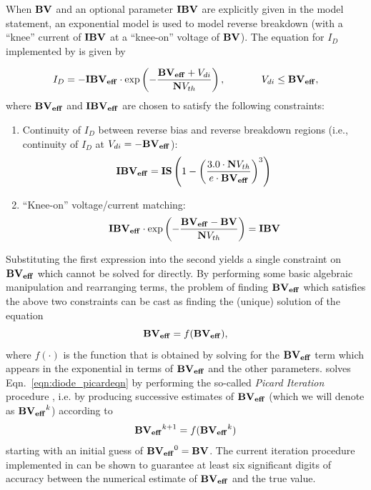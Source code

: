 When $\mathbf{BV}$ and an optional parameter $\mathbf{IBV}$ are explicitly given in the model
statement, an exponential model is used to model reverse breakdown (with a
``knee'' current of $\mathbf{IBV}$ at a ``knee-on'' voltage of $\mathbf{BV}$).  The equation
for $I_D$ implemented by \Xyce{} is given by

\[
I_D = -\mathbf{IBV_{eff}}\cdot\exp \left(-\frac{\mathbf{BV_{eff}} + V_{di}}{\mathbf{N}V_{th}}
\right), \hspace*{0.5in} V_{di} \leq \mathbf{BV_{eff}},
\]
where $\mathbf{BV_{eff}}$ and $\mathbf{IBV_{eff}}$ are chosen to satisfy the following
constraints:
\begin{enumerate}
\item Continuity of $I_D$ between reverse bias and reverse breakdown regions
(i.e., continuity of $I_D$ at $V_{di}=-\mathbf{BV_{eff}}$):
\[
\mathbf{IBV_{eff}}=\mathbf{IS}\left(1-\left(\frac{3.0\cdot\mathbf{N} V_{th}}{e\cdot\mathbf{BV_{eff}}}
\right)^3\right)
\]
\item ``Knee-on'' voltage/current matching:
\[
\mathbf{IBV_{eff}}\cdot\exp\left(-\frac{\mathbf{BV_{eff}}-\mathbf{BV}}{\mathbf{N} V_{th}}\right)=\mathbf{IBV}
\]
\end{enumerate}
Substituting the first expression into the second yields a single constraint
on $\mathbf{BV_{eff}}$ which cannot be solved for directly.  By performing some basic
algebraic manipulation and rearranging terms, the problem of finding
$\mathbf{BV_{eff}}$ which satisfies the above two constraints can be cast as finding
the (unique) solution of the equation
\begin{equation}
\mathbf{BV_{eff}} = f(\mathbf{BV_{eff}}),
\label{eqn:diode_picardeqn}
\end{equation}
where $f(\cdot)$ is the function that is obtained by solving for the
$\mathbf{BV_{eff}}$ term which appears in the exponential in terms of $\mathbf{BV_{eff}}$ and the
other parameters.  \Xyce{} solves Eqn.\ \ref{eqn:diode_picardeqn} by performing
the so-called {\em Picard Iteration} procedure \cite{mattuck:1999}, i.e.
by producing successive estimates of $\mathbf{BV_{eff}}$ (which we will denote as
$\mathbf{BV_{eff}} ^ k$) according to
\[
\mathbf{BV_{eff}}^{k+1}=f(\mathbf{BV_{eff}}^k)
\]
starting with an initial guess of $\mathbf{BV_{eff}}^0=\mathbf{BV}$.  The current iteration
procedure implemented in \Xyce{} can be shown to guarantee at least six
significant digits of accuracy between the numerical estimate of $\mathbf{BV_{eff}}$ and
the true value.

